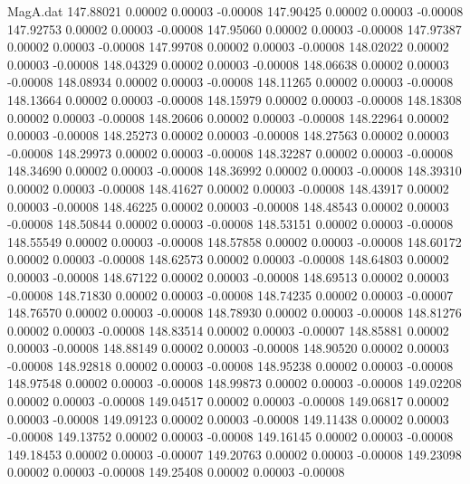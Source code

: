 \begin{filecontents}{MagA.dat}
 147.88021    0.00002    0.00003   -0.00008
 147.90425    0.00002    0.00003   -0.00008
 147.92753    0.00002    0.00003   -0.00008
 147.95060    0.00002    0.00003   -0.00008
 147.97387    0.00002    0.00003   -0.00008
 147.99708    0.00002    0.00003   -0.00008
 148.02022    0.00002    0.00003   -0.00008
 148.04329    0.00002    0.00003   -0.00008
 148.06638    0.00002    0.00003   -0.00008
 148.08934    0.00002    0.00003   -0.00008
 148.11265    0.00002    0.00003   -0.00008
 148.13664    0.00002    0.00003   -0.00008
 148.15979    0.00002    0.00003   -0.00008
 148.18308    0.00002    0.00003   -0.00008
 148.20606    0.00002    0.00003   -0.00008
 148.22964    0.00002    0.00003   -0.00008
 148.25273    0.00002    0.00003   -0.00008
 148.27563    0.00002    0.00003   -0.00008
 148.29973    0.00002    0.00003   -0.00008
 148.32287    0.00002    0.00003   -0.00008
 148.34690    0.00002    0.00003   -0.00008
 148.36992    0.00002    0.00003   -0.00008
 148.39310    0.00002    0.00003   -0.00008
 148.41627    0.00002    0.00003   -0.00008
 148.43917    0.00002    0.00003   -0.00008
 148.46225    0.00002    0.00003   -0.00008
 148.48543    0.00002    0.00003   -0.00008
 148.50844    0.00002    0.00003   -0.00008
 148.53151    0.00002    0.00003   -0.00008
 148.55549    0.00002    0.00003   -0.00008
 148.57858    0.00002    0.00003   -0.00008
 148.60172    0.00002    0.00003   -0.00008
 148.62573    0.00002    0.00003   -0.00008
 148.64803    0.00002    0.00003   -0.00008
 148.67122    0.00002    0.00003   -0.00008
 148.69513    0.00002    0.00003   -0.00008
 148.71830    0.00002    0.00003   -0.00008
 148.74235    0.00002    0.00003   -0.00007
 148.76570    0.00002    0.00003   -0.00008
 148.78930    0.00002    0.00003   -0.00008
 148.81276    0.00002    0.00003   -0.00008
 148.83514    0.00002    0.00003   -0.00007
 148.85881    0.00002    0.00003   -0.00008
 148.88149    0.00002    0.00003   -0.00008
 148.90520    0.00002    0.00003   -0.00008
 148.92818    0.00002    0.00003   -0.00008
 148.95238    0.00002    0.00003   -0.00008
 148.97548    0.00002    0.00003   -0.00008
 148.99873    0.00002    0.00003   -0.00008
 149.02208    0.00002    0.00003   -0.00008
 149.04517    0.00002    0.00003   -0.00008
 149.06817    0.00002    0.00003   -0.00008
 149.09123    0.00002    0.00003   -0.00008
 149.11438    0.00002    0.00003   -0.00008
 149.13752    0.00002    0.00003   -0.00008
 149.16145    0.00002    0.00003   -0.00008
 149.18453    0.00002    0.00003   -0.00007
 149.20763    0.00002    0.00003   -0.00008
 149.23098    0.00002    0.00003   -0.00008
 149.25408    0.00002    0.00003   -0.00008

\end{filecontents}
